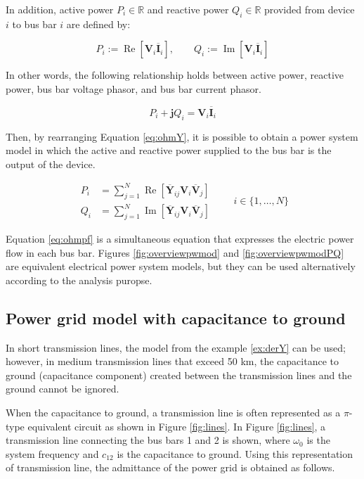 \documentclass[graybox, envcountchap]{svmult}
\begin{document}
In addition, active power $P_i \in \mathbb{R}$ and reactive power $Q_i \in
\mathbb{R}$ provided from device $i$ to bus bar $i$ are defined by: 

\[
  P_i := \operatorname{Re} \left[ \bm{V}_i \overline{\bm{{I}} }_i \right], \qquad
  Q_i := \operatorname{Im} \left[ \bm{V}_i \overline{\bm{{I}} }_i \right]
\]

In other words, the following relationship holds between active power, reactive
power, bus bar voltage phasor, and bus bar current phasor.

\begin{equation}\label{eq:defPQVIi}
  P_i+\bm{j}Q_i = \bm{V}_i \overline{\bm{{I}} }_i
\end{equation}

Then, by rearranging Equation \ref{eq:ohmY}, it is possible to obtain a power
system model in which the active and reactive power supplied to the bus bar is
the output of the device.

\begin{equation}\label{eq:ohmpf}
  \begin{aligned}
    P_i &= \sum_{j=1}^{N}
    \operatorname{Re} \left[ \overline{\bm{Y}}_{ij} \bm{V}_i \overline{\bm{V}}_j 
    \right] \\
    Q_i &= \sum_{j=1}^{N}
    \operatorname{Im} \left[
    \overline{\bm{Y}}_{ij} \bm{V}_i \overline{\bm{V}}_j 
    \right]
  \end{aligned}
  \qquad
  i \in \{1,\ldots, N\}
\end{equation}

Equation \ref{eq:ohmpf} is a simultaneous equation that expresses the electric
power flow in each bus bar. Figures \ref{fig:overviewpwmod} and
\ref{fig:overviewpwmodPQ} are equivalent electrical power system models, but
they can be used alternatively according to the analysis puropse.

\subsection{Power grid model with capacitance to ground}\label{sec:transmodc}

In short transmission lines, the model from the example \ref{ex:derY} can be
used; however, in medium transmission lines that exceed 50 km, the capacitance
to ground (capacitance component) created between the transmission lines and the
ground cannot be ignored. 

When the capacitance to ground, a transmission line is often represented as a
$\pi$-type equivalent circuit as shown in Figure \ref{fig:lines}. In Figure
\ref{fig:lines}, a transmission line connecting the bus bars 1 and 2 is shown,
where $\omega_0$ is the system frequency and $c_{12}$ is the capacitance to
ground. Using this representation of transmission line, the admittance of the
power grid is obtained as follows.
\end{document}
